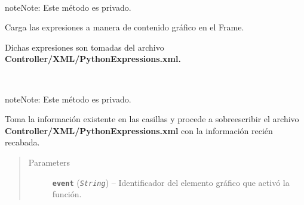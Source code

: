 \documentclass[letterpaper,10pt,english]{sphinxmanual}
\begin{document}
\begin{fulllineitems}
\begin{fulllineitems}
\end{fulllineitems}


\begin{fulllineitems}
\label{View/Additional/MenuInternalOption/InternalOptionTab/ExpressionFrame:View.Additional.MenuInternalOption.InternalOptionTab.ExpressionFrame.ExpressionFrame._ExpressionFrame__load_expressions}~
\begin{notice}{note}{Note:}
Este método es privado.
\end{notice}

\begin{DUlineblock}{0em}
\item[] Carga las expresiones a manera de contenido gráfico
en el Frame.
\item[] Dichas expresiones son tomadas del archivo 
\textbf{Controller/XML/PythonExpressions.xml.}
\end{DUlineblock}

\end{fulllineitems}


\begin{fulllineitems}
\label{View/Additional/MenuInternalOption/InternalOptionTab/ExpressionFrame:View.Additional.MenuInternalOption.InternalOptionTab.ExpressionFrame.ExpressionFrame._ExpressionFrame__save_changes}~
\begin{notice}{note}{Note:}
Este método es privado.
\end{notice}

Toma la información existente en las casillas y procede a sobreescribir
el archivo \textbf{Controller/XML/PythonExpressions.xml} con la información
recién recabada.
\begin{quote}\begin{description}
\item[{Parameters}] \leavevmode
\textbf{\texttt{event}} (\emph{\texttt{String}}) -- Identificador del elemento gráfico que activó la función.

\end{description}\end{quote}

\end{fulllineitems}


\end{fulllineitems}
\end{document}
